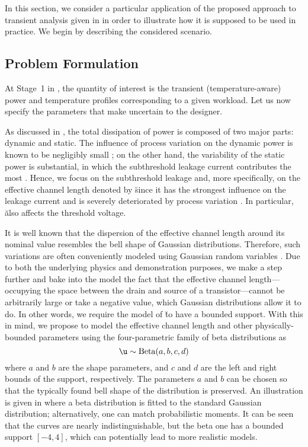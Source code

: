 In this section, we consider a particular application of the proposed approach
to transient analysis given in  in order to
illustrate how it is supposed to be used in practice. We begin by describing the
considered scenario.

\subsection{Problem Formulation}

At Stage~1 in , the quantity of interest \g is the
transient (temperature-aware) power and temperature profiles corresponding to a
given workload. Let us now specify the parameters \vu that make \g uncertain to
the designer.

As discussed in , the total dissipation of power is composed
of two major parts: dynamic and static. The influence of process variation on
the dynamic power is known to be negligibly small \cite{srivastava2010}; on the
other hand, the variability of the static power is substantial, in which the
subthreshold leakage current contributes the most \cite{juan2011, juan2012}.
Hence, we focus on the subthreshold leakage and, more specifically, on the
effective channel length denoted by \u since it has the strongest influence on
the leakage current and is severely deteriorated by process variation
\cite{chandrakasan2000}. In particular, \u also affects the threshold voltage.

It is well known that the dispersion of the effective channel length around its
nominal value resembles the bell shape of Gaussian distributions. Therefore,
such variations are often conveniently modeled using Gaussian random variables
\cite{bhardwaj2006, ghanta2006, huang2009a, shen2009, chandra2010,
srivastava2010, juan2011, juan2012, lee2013}. Due to both the underlying physics
and demonstration purposes, we make a step further and bake into the model the
fact that the effective channel length---occupying the space between the drain
and source of a transistor---cannot be arbitrarily large or take a negative
value, which Gaussian distributions allow it to do. In other words, we require
the model of \u to have a bounded support. With this in mind, we propose to
model the effective channel length and other physically-bounded parameters using
the four-parametric family of beta distributions as
\[
  \u \sim \mathrm{Beta}(a, b, c, d)
\]
where $a$ and $b$ are the shape parameters, and $c$ and $d$ are the left and
right bounds of the support, respectively. The parameters $a$ and $b$ can be
chosen so that the typically found bell shape of the distribution is preserved.
An illustration is given in  where a beta distribution is
fitted to the standard Gaussian distribution; alternatively, one can match
probabilistic moments. It can be seen that the curves are nearly
indistinguishable, but the beta one has a bounded support $[-4, 4]$, which can
potentially lead to more realistic models.

